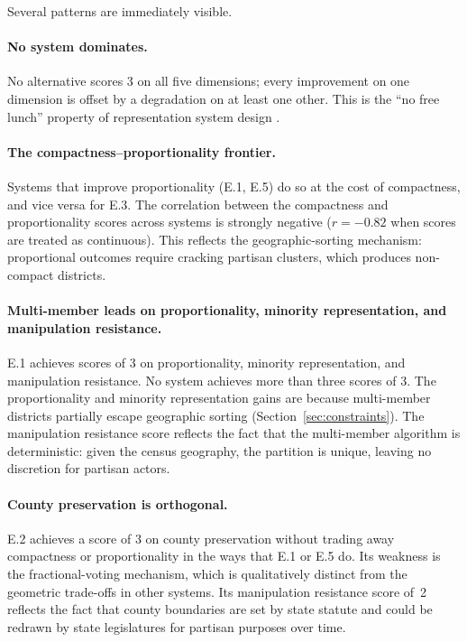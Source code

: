 Several patterns are immediately visible.

\paragraph{No system dominates.}
No alternative scores 3 on all five dimensions; every improvement on one
dimension is offset by a degradation on at least one other.  This is the
``no free lunch'' property of representation system design \citep{wolpert1997no}.

\paragraph{The compactness--proportionality frontier.}
Systems that improve proportionality (E.1, E.5) do so at the cost of
compactness, and vice versa for E.3.  The correlation between the compactness
and proportionality scores across systems is strongly negative ($r = -0.82$
when scores are treated as continuous).  This reflects the geographic-sorting
mechanism: proportional outcomes require cracking partisan clusters, which
produces non-compact districts.

\paragraph{Multi-member leads on proportionality, minority representation, and manipulation resistance.}
E.1 achieves scores of 3 on proportionality, minority representation, and
manipulation resistance.  No system achieves more than three scores of 3.
The proportionality and minority representation gains are because multi-member
districts partially escape geographic sorting
(Section~\ref{sec:constraints}).  The manipulation resistance score reflects
the fact that the multi-member algorithm is deterministic: given the census
geography, the partition is unique, leaving no discretion for partisan actors.

\paragraph{County preservation is orthogonal.}
E.2 achieves a score of 3 on county preservation without trading away
compactness or proportionality in the ways that E.1 or E.5 do.  Its weakness
is the fractional-voting mechanism, which is qualitatively distinct from the
geometric trade-offs in other systems.  Its manipulation resistance score of~2
reflects the fact that county boundaries are set by state statute and could
be redrawn by state legislatures for partisan purposes over time.

